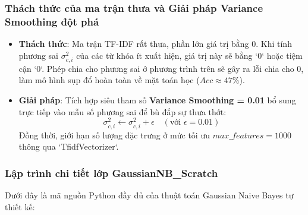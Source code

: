 \documentclass[a4paper]{article}
\begin{document}
\subsubsection{Thách thức của ma trận thưa và Giải pháp Variance Smoothing đột phá}
\begin{itemize}
    \item \textbf{Thách thức}: Ma trận TF-IDF rất thưa, phần lớn giá trị bằng 0. Khi tính phương sai $\sigma_{c,i}^2$ của các từ khóa ít xuất hiện, giá trị này sẽ bằng `0` hoặc tiệm cận `0`. Phép chia cho phương sai ở phương trình trên sẽ gây ra lỗi chia cho 0, làm mô hình sụp đổ hoàn toàn về mặt toán học ($Acc \approx 47\%$).
    \item \textbf{Giải pháp}: Tích hợp siêu tham số \textbf{Variance Smoothing = 0.01} bổ sung trực tiếp vào mẫu số phương sai để bù đắp sự thưa thớt:
    \begin{equation}
        \sigma_{c,i}^2 \leftarrow \sigma_{c,i}^2 + \epsilon \quad (\text{với } \epsilon = 0.01)
    \end{equation}
    Đồng thời, giới hạn số lượng đặc trưng ở mức tối ưu $max\_features=1000$ thông qua `TfidfVectorizer`.
\end{itemize}

\subsubsection{Lập trình chi tiết lớp GaussianNB\_Scratch}
Dưới đây là mã nguồn Python đầy đủ của thuật toán Gaussian Naive Bayes tự thiết kế:
\end{document}
